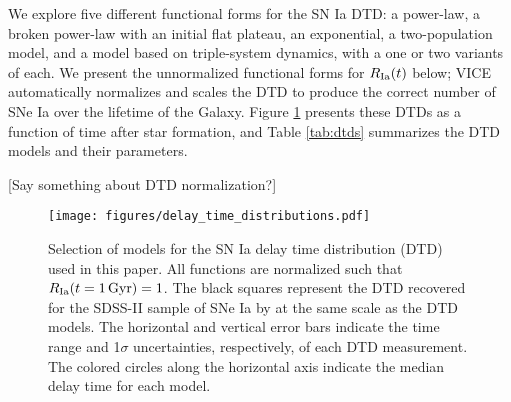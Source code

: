 \documentclass[twocolumn,twocolappendix,linenumbers,trackchanges]{aastex631}
\begin{document}
We explore five different functional forms for the SN Ia DTD: a power-law, a broken power-law with an initial flat plateau, an exponential, a two-population model, and a model based on triple-system dynamics, with a one or two variants of each. We present the unnormalized functional forms for $R_{\rm Ia}(t)$ below; VICE automatically normalizes and scales the DTD to produce the correct number of SNe Ia over the lifetime of the Galaxy. Figure \ref{fig:dtds} presents these DTDs as a function of time after star formation, and Table \ref{tab:dtds} summarizes the DTD models and their parameters.

[Say something about DTD normalization?]

\begin{figure}
    \centering
    \texttt{[image: figures/delay\_time\_distributions.pdf]}
    \caption{Selection of models for the SN Ia delay time distribution (DTD) used in this paper. All functions are normalized such that $R_{\rm Ia}(t=1\,{\rm Gyr})=1$. The black squares represent the DTD recovered for the SDSS-II sample of SNe Ia by \citet{Maoz2012-SloanIIDTD} at the same scale as the DTD models. The horizontal and vertical error bars indicate the time range and 1$\sigma$ uncertainties, respectively, of each DTD measurement. The colored circles along the horizontal axis indicate the median delay time for each model.}
    \label{fig:dtds}
\end{figure}
\end{document}
